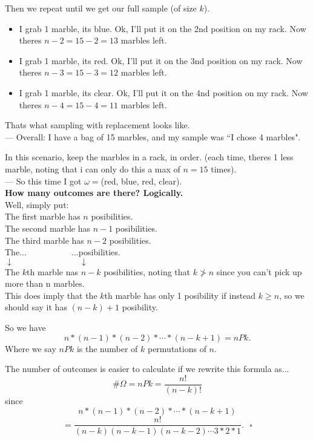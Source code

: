 \documentclass[12pt]{book}
\begin{document}
\noindent Then we repeat until we get our full sample (of size $k$). 
\begin{itemize}
\item I grab 1 marble, its blue. Ok, I'll put it on the 2nd position on my rack. Now theres $n-2=15-2=13$ marbles left.
\item I grab 1 marble, its red. Ok, I'll put it on the 3nd position on my rack. Now theres $n-3=15-3=12$ marbles left.
\item I grab 1 marble, its clear. Ok, I'll put it on the 4nd position on my rack. Now theres $n-4=15-4=11$ marbles left.
\end{itemize}
Thats what sampling with replacement looks like. \\
--- Overall: I have a bag of 15 marbles, and my sample was ``I chose 4 marbles". 

In this scenario, keep the marbles in a rack, in order. (each time, theres 1 less marble, noting that i can only do this a max of $n=15$ times).\\
--- So this time I got $\omega =$(red, blue, red, clear).\\

\noindent \textbf{How many outcomes are there? Logically.} \\
Well, simply put:\\
The first marble has $n$ posibilities. \\
The second marble has $n-1$ posibilities.\\
The third marble has $n-2$ posibilities.\\
The...$~~~~~~~~~~~~~~~~~~~~~~~~$...posibilities.\\
$\downarrow ~~~~~~~~~~~~~~~~~~~~~~~~~~~~~~~~~~~\downarrow$\\
The $k$th marble nas $n-k$ posibilities, noting that $k\ngtr n$ since you can't pick up more than n marbles. \\
This does imply that the $k$th marble has only 1 posibility if instead $k\geq n$, so we should say it has $(n-k) + 1$ posibility.

So we have $$n*(n-1)*(n-2)* \cdots *(n-k+1) = nPk.$$
Where we say $nPk$ is the number of $k$ permutations of $n$.

The number of outcomes is easier to calculate if we rewrite this formula as...
$$\#\Omega = nPk = \frac{n!}{(n-k)!}$$
since 
$$n*(n-1)*(n-2)* \cdots *(n-k+1)$$
$$ = \frac{n!}{(n-k)(n-k-1)(n-k-2)\cdots 3*2*1}.~~~\square$$
\end{document}

